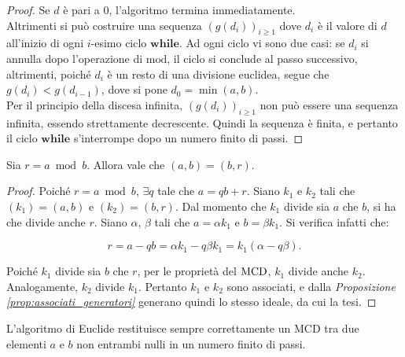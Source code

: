 \begin{proof}
    Se $d$ è pari a $0$, l'algoritmo termina immediatamente. \\

    Altrimenti si può costruire una sequenza $(g(d_i))_{i\geq1}$ dove $d_i$ è il valore di $d$ all'inizio
    di ogni $i$-esimo ciclo $\textbf{while}$. Ad ogni ciclo vi sono due casi: se $d_i$ si annulla dopo
    l'operazione di $\mathrm{mod}$, il ciclo si conclude al passo successivo, altrimenti,
    poiché $d_i$ è un resto di una divisione euclidea, segue che $g(d_i)<g(d_{i-1})$, dove
    si pone $d_{0}=\min(a, b)$. \\

    Per il principio della discesa infinita, $(g(d_i))_{i\geq1}$ non può essere
    una sequenza infinita, essendo strettamente decrescente. Quindi la sequenza è
    finita, e pertanto il ciclo $\textbf{while}$ s'interrompe dopo un numero finito
    di passi.
\end{proof}

\begin{lemma}
    \label{lem:generatori_euclide}
    Sia $r = a \bmod b$. Allora vale che $(a,b)=(b,r)$.
\end{lemma}

\begin{proof}
    Poiché $r = a \bmod b$, $\exists q$ tale che $a = qb + r$.
    Siano $k_1$ e $k_2$ tali che $(k_1)=(a,b)$ e $(k_2)=(b,r)$. Dal
    momento che $k_1$ divide sia $a$ che $b$, si ha che divide anche
    $r$. Siano $\alpha$, $\beta$ tali che $a = \alpha k_1$ e
    $b = \beta k_1$. Si verifica infatti che:

    \[ r = a - qb = \alpha k_1 - q \beta k_1 = k_1 (\alpha - q \beta). \]

    Poiché $k_1$ divide sia $b$ che $r$, per le proprietà del $\operatorname{MCD}$,
    $k_1$ divide anche $k_2$. Analogamente, $k_2$ divide $k_1$. Pertanto
    $k_1$ e $k_2$ sono associati, e dalla \textit{Proposizione \ref{prop:associati_generatori}} generano quindi lo stesso ideale, da
    cui la tesi.
\end{proof}

\begin{theorem}
    L'algoritmo di Euclide restituisce sempre correttamente un MCD tra due elementi $a$ e $b$ non entrambi nulli in un numero finito di passi.
\end{theorem}

